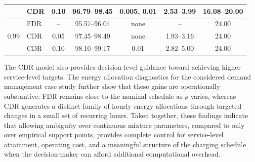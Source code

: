 \documentclass[opre,sglanonrev]{informs4}
\begin{document}
\begin{table}[!hbtp]
\begin{tabular}{c l c c c c c}
& CDR & 0.10 & 96.79--98.45 & 0.005, 0.01 & 2.53--3.99 & 16.08--20.00 \\
\midrule
\multirow{3}{*}{0.99}
& FDR & -- & 95.57--96.04 & none & -- & 24.00 \\
& CDR & 0.05 & 97.45--98.49 & none & 1.93--3.16 & 24.00 \\
& CDR & 0.10 & 98.10--99.17 & 0.01 & 2.82--5.00 & 24.00 \\
\bottomrule
\end{tabular}
\end{table}

The CDR model also provides decision-level guidance toward achieving higher service-level targets. The energy allocation diagnostics for the considered demand management case study further show that these gains are operationally substantive: FDR remains close to the nominal schedule as \(\rho\) varies, whereas CDR generates a distinct family of hourly energy allocations through targeted changes in a small set of recurring hours. Taken together, these findings indicate that allowing ambiguity over continuous mixture parameters, compared to only over empirical support points, provides complete control for service-level attainment, operating cost, and a meaningful structure of the charging schedule when the decision-maker can afford additional computational overhead.
\end{document}
